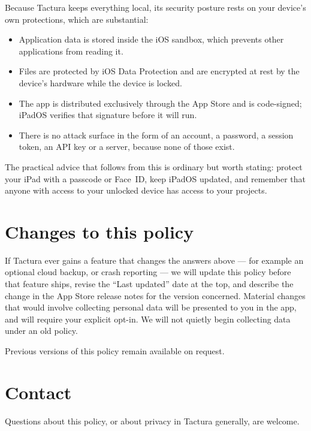 \documentclass[11pt]{article}
\begin{document}
Because Tactura keeps everything local, its security posture rests on your device's own
protections, which are substantial:

\begin{itemize}
  \item Application data is stored inside the iOS sandbox, which prevents other
        applications from reading it.
  \item Files are protected by iOS Data Protection and are encrypted at rest by the
        device's hardware while the device is locked.
  \item The app is distributed exclusively through the App Store and is code-signed;
        iPadOS verifies that signature before it will run.
  \item There is no attack surface in the form of an account, a password, a session
        token, an API key or a server, because none of those exist.
\end{itemize}

The practical advice that follows from this is ordinary but worth stating: protect your
iPad with a passcode or Face~ID, keep iPadOS updated, and remember that anyone with
access to your unlocked device has access to your projects.

\section{Changes to this policy}

If Tactura ever gains a feature that changes the answers above — for example an
optional cloud backup, or crash reporting — we will update this policy before that
feature ships, revise the “Last updated” date at the top, and describe the change in
the App Store release notes for the version concerned. Material changes that would
involve collecting personal data will be presented to you in the app, and will require
your explicit opt-in. We will not quietly begin collecting data under an old policy.

Previous versions of this policy remain available on request.

\section{Contact}

Questions about this policy, or about privacy in Tactura generally, are welcome.
\end{document}
